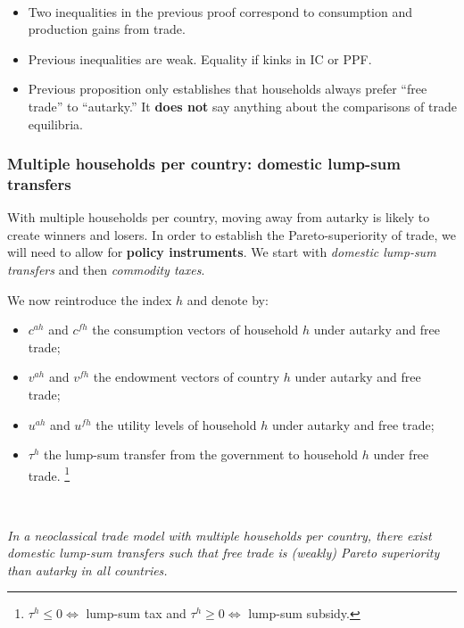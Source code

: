 \begin{note}
    \

    \begin{itemize}
        \item Two inequalities in the previous proof correspond to consumption and
        production gains from trade.
        \item Previous inequalities are weak. Equality if kinks in IC or PPF.
        \item Previous proposition only establishes that households always prefer
        ``free trade'' to ``autarky.'' It \textbf{does not} say anything about the
        comparisons of trade equilibria.
    \end{itemize}
\end{note}

\subsubsection{Multiple households per country: domestic lump-sum transfers}
With multiple households per country, moving away from autarky is likely to create winners and losers.
In order to establish the Pareto-superiority of trade, we will need to allow for \textbf{policy instruments}.
We start with \textit{domestic lump-sum transfers} and then \textit{commodity taxes}.

We now reintroduce the index $h$ and denote by:
\begin{itemize}
    \item $c^{ah}$ and $c^{fh}$ the consumption vectors of household $h$ under autarky and free trade;
    \item $v^{ah}$ and $v^{fh}$ the endowment vectors of country $h$ under autarky and free trade;
    \item $u^{ah}$ and $u^{fh}$ the utility levels of household $h$ under autarky and free trade;
    \item $\tau^{h}$ the lump-sum transfer from the government to household $h$ under free trade.
    \footnote{$\tau ^h \leq 0 \Leftrightarrow$ lump-sum tax and $\tau ^h \geq 0 \Leftrightarrow$ lump-sum subsidy.}
\end{itemize}

\begin{proposition}\label{prop:2}
    \

    \textit{In a neoclassical trade model with multiple households per country,
    there exist domestic lump-sum transfers such that free trade is (weakly) Pareto superiority
    than autarky in all countries.}
\end{proposition}

